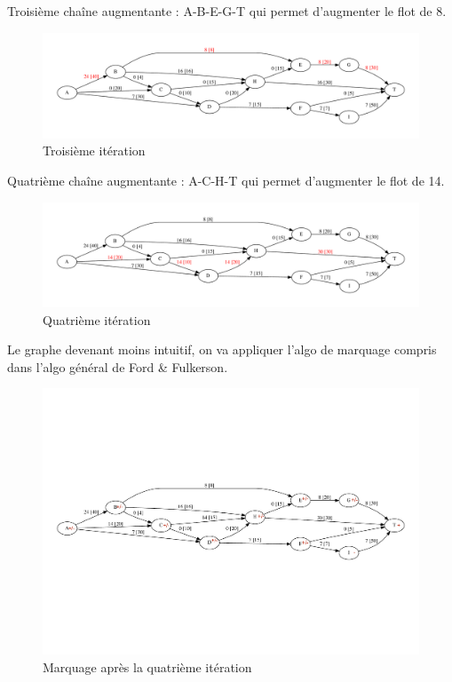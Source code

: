 \documentclass[paper=a4, fontsize=11pt]{scrartcl} %
\numberwithin{equation}{section} %
\numberwithin{figure}{section} %
\numberwithin{table}{section} %
\begin{document}
Troisième chaîne augmentante : A-B-E-G-T qui permet d'augmenter le flot de 8. 

\begin{figure}[h]
\begin{center}
	\includegraphics[width=\textwidth]{figs/reseau-3.pdf}
	\caption{Troisième itération}
	\label{fig:res:3}
\end{center}
\end{figure}

Quatrième chaîne augmentante : A-C-H-T qui permet d'augmenter le flot de 14.

\begin{figure}[h]
\begin{center}
	\includegraphics[width=\textwidth]{figs/reseau-4.pdf}
	\caption{Quatrième itération}
	\label{fig:res:4}
\end{center}
\end{figure}

Le graphe devenant moins intuitif, on va appliquer l'algo de marquage compris dans l'algo général de Ford \& Fulkerson.

\begin{figure}[h]
\begin{center}
	\includegraphics[width=\textwidth]{figs/reseau-4m.pdf}
	\caption{Marquage après la quatrième itération}
	\label{fig:res:4m}
\end{center}
\end{figure}
\end{document}
